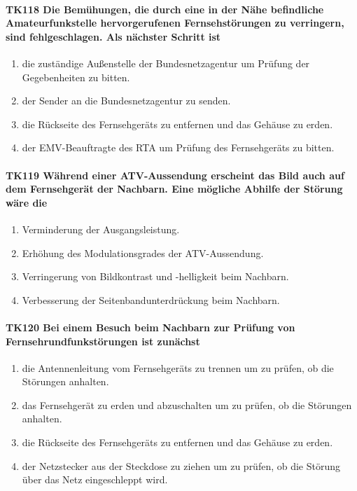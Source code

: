\documentclass[8pt]{article}
\begin{document}
\paragraph*{TK118 Die Bemühungen, die durch eine in der Nähe befindliche Amateurfunkstelle hervorgerufenen Fernsehstörungen zu verringern, sind fehlgeschlagen. Als nächster Schritt ist} 
\begin{enumerate}[nolistsep,label=\Alph*]
\item die zuständige Außenstelle der Bundesnetzagentur um Prüfung der Gegebenheiten zu bitten.
\item der Sender an die Bundesnetzagentur zu senden. 
\item die Rückseite des Fernsehgeräts zu entfernen und das Gehäuse zu erden.
\item der EMV-Beauftragte des RTA um Prüfung des Fernsehgeräts zu bitten.
\end{enumerate}

\paragraph*{TK119 Während einer ATV-Aussendung erscheint das Bild auch auf dem Fernsehgerät der Nachbarn. Eine mögliche Abhilfe der Störung wäre die}
\begin{enumerate}[nolistsep,label=\Alph*]
\item Verminderung der Ausgangsleistung.
\item Erhöhung des Modulationsgrades der ATV-Aussendung.
\item Verringerung von Bildkontrast und -helligkeit beim Nachbarn.
\item Verbesserung der Seitenbandunterdrückung beim Nachbarn.
\end{enumerate}

\paragraph*{TK120 Bei einem Besuch beim Nachbarn zur Prüfung von Fernsehrundfunkstörungen ist zunächst}
\begin{enumerate}[nolistsep,label=\Alph*]
\item die Antennenleitung vom Fernsehgeräts zu trennen um zu prüfen, ob die Störungen anhalten.
\item das Fernsehgerät zu erden und abzuschalten um zu prüfen, ob die Störungen anhalten.
\item die Rückseite des Fernsehgeräts zu entfernen und das Gehäuse zu erden.
\item der Netzstecker aus der Steckdose zu ziehen um zu prüfen, ob die Störung über das Netz eingeschleppt wird.
\end{enumerate}
\end{document}
